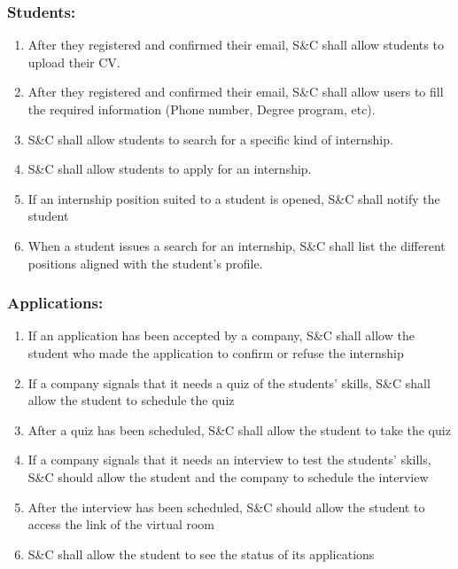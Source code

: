     \subsubsection*{Students:}
        \begin{enumerate}[label=\textbf{R\arabic*},resume]
            \item After they registered and confirmed their email, S\&C shall allow students to upload their CV.  
            \item After they registered and confirmed their email, S\&C shall allow users to fill the required information (Phone number, Degree program, etc).
            \item S\&C shall allow students to search for a specific kind of internship.  
            \item S\&C shall allow students to apply for an internship.                    
            \item If an internship position suited to a student is opened, S\&C shall notify the student
            \item When a student issues a search for an internship, S\&C shall list the different positions aligned with the student's profile.         
    
            
        \end{enumerate}
    
    \subsubsection*{Applications:}
        \begin{enumerate}[label=\textbf{R\arabic*},resume]
            \item If an application has been accepted by a company, S\&C shall allow the student who made the application to confirm or refuse the internship
            \item If a company signals that it needs a quiz of the students' skills, S\&C shall allow the student to schedule the quiz
            \item After a quiz has been scheduled, S\&C shall allow the student to take the quiz
            \item If a company signals that it needs an interview to test the students' skills, S\&C should allow the student and the company to schedule the interview
            \item After the interview has been scheduled, S\&C should allow the student to access the link of the virtual room
            \item S\&C shall allow the student to see the status of its applications
            
        \end{enumerate}
    
